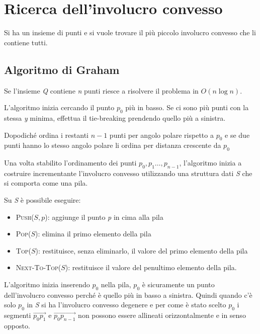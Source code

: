 \section{Ricerca dell'involucro convesso}\label{rircerca-dellinvolucro-convesso}

Si ha un insieme di punti e si vuole trovare il più piccolo involucro convesso che li contiene tutti.

\subsection{Algoritmo di Graham}\label{algortimo-di-graham}

Se l'insieme \emph{Q} contiene \emph{n} punti riesce a risolvere il problema in $O(n \log n)$.

L'algoritmo inizia cercando il punto $p_0$ più in basso. 
Se ci sono più punti con la stessa \emph{y} minima, effettua il tie-breaking prendendo quello più a sinistra.

Dopodiché ordina i restanti $n-1$ punti per angolo polare rispetto a $p_0$ e se due punti hanno lo stesso angolo polare li ordina per distanza crescente da $p_0$

Una volta stabilito l'ordinamento dei punti $p_0, p_1 \ldots, p_{n-1}$, l'algoritmo inizia a costruire incrementante l'involucro convesso utilizzando una struttura dati \emph{S} che si comporta come una pila.

Su \emph{S} è possibile eseguire:

\begin{itemize}
\item
  \textsc{Push($S,p$)}: aggiunge il punto \emph{p} in cima alla pila
\item
  \textsc{Pop($S$)}: elimina il primo elemento della pila
\item
  \textsc{Top($S$)}: restituisce, senza eliminarlo, il valore del primo
  elemento della pila
\item
  \textsc{Next-To-Top($S$)}: restituisce il valore del penultimo elemento
  della pila.
\end{itemize}

L'algoritmo inizia inserendo $p_0$ nella pila, $p_0$ è sicuramente un punto dell'involucro convesso perché è quello più in basso a sinistra. 
Quindi quando c'è solo $p_0$ in \emph{S} si ha l'involucro convesso degenere e per come è stato scelto $ p_0 $ i segmenti $ \overrightarrow{p_0p_1} $ e $\overrightarrow{p_0p_{n-1}}$ non possono essere allineati orizzontalmente e in senso opposto.

